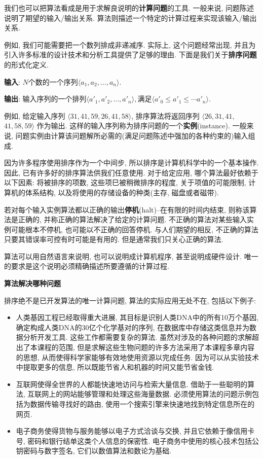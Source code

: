 \documentclass[oneside,10pt,fontset=none]{ctexbook}
\begin{document}
我们也可以把算法看成是用于求解良说明的\textbf{计算问题}的工具. 一般来说, 问题陈述说明了期望的输入/输出关系. 算法则描述一个特定的计算过程来实现该输入/输出关系.

例如, 我们可能需要把一个数列排成非递减序. 实际上, 这个问题经常出现, 并且为引入许多标准的设计技术和分析工具提供了足够的理由. 下面是我们关于\textbf{排序问题}的形式化定义.

\textbf{输入}: $N$个数的一个序列$\langle a_1, a_2, \dots, a_n\rangle$.

\textbf{输出}: 输入序列的一个排列$\langle a'_1, a'_2, \dots, a'_n\rangle , \text{满足}\langle a'_0\leq a'_1 \leq\cdots a'_n\rangle$.

例如, 给定输入序列 $\langle 31, 41, 59, 26, 41, 58\rangle$, 排序算法将返回序列 $\langle 26, 31, 41,$ $ 41, 58, 59\rangle$ 作为输出. 这样的输入序列称为排序问题的一个\textbf{实例}(instance). 一般来说, 问题实例由计算该问题解所必需的(满足问题陈述中强加的各种约束的)输入组成.

因为许多程序使用排序作为一个中间步, 所以排序是计算机科学中的一个基本操作. 因此, 已有许多好的排序算法供我们任意使用. 对于给定应用, 哪个算法最好依赖于以下因素: 将被排序的项数, 这些项巳被稍微排序的程度, 关于项值的可能限制, 计算机的体系结构, 以及将使用的存储设备的种类(主存, 磁盘或者磁带).

若对每个输入实例算法都以正确的输出\textbf{停机}(halt)--在有限的时间内结束, 则称该算法是正确的, 并称正确的算法解决了给定的计算问题. 不正确的算法对某些输入实例可能根本不停机, 也可能以不正确的回答停机. 与人们期望的相反, 不正确的算法只要其错误率可控有时可能是有用的. 但是通常我们只关心正确的算法.

算法可以用自然语言来说明, 也可以说明成计算机程序, 甚至说明成硬件设计. 唯一的要求是这个说明必须精确描述所要遵循的计算过程.

\textbf{算法解决哪种问题}

排序绝不是已开发算法的唯一计算问题, 算法的实际应用无处不在, 包括以下例子:

\begin{itemize}
    \item 人类基因工程已经取得重大进展, 其目标是识别人类DNA中的所有10万个基因, 确定构成人类DNA的30亿个化学基对的序列, 在数据库中存储这类信息并为数据分析开发工具. 这些工作都需要复杂的算法. 虽然对涉及的各种问题的求解超出了本课程的范围, 但是求解这些生物问题的许多方法采用了本课程多章内容的思想, 从而使得科学家能够有效地使用资源以完成任务. 因为可以从实验技术中提取更多的信息, 所以既能节省人和机器的时间又能节省金钱.
    \item 互联网使得全世界的人都能快速地访问与检索大量信息. 借助于一些聪明的算法, 互联网上的网站能够管理和处理这些海量数据. 必须使用算法的问题示例包括为数据传输寻找好的路由, 使用一个搜索引擎来快速地找到特定信息所在的网页.
    \item 电子商务使得货物与服务能够以电子方式洽谈与交换, 并且它依赖于像信用卡号, 密码和银行结单这类个人信息的保密性. 电子商务中使用的核心技术包括公钥密码与数字签名, 它们以数值算法和数论为基础.
\end{itemize}
\end{document}
